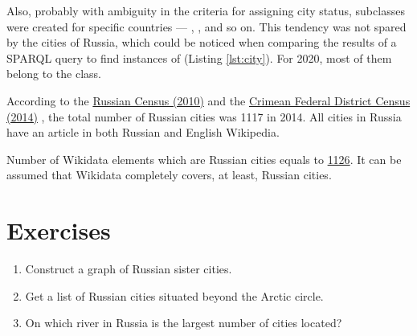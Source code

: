 Also, probably with ambiguity in the criteria for assigning city status, subclasses were created for specific countries — , ,  and so on. This tendency was not spared by the cities of Russia, which could be noticed when comparing the results of a SPARQL query to find instances of   (Listing \ref{lst:city}). For 2020, most of them belong to the  class.

According to the \href{http://www.gks.ru/free\_doc/new\_site/perepis2010/croc/Documents/Vol1/pub-01-03.pdf}{Russian Census (2010)}  and the \href{https://rosstat.gov.ru/free\_doc/new\_site/population/demo/perepis\_krim/KRUM\_2015.pdf}{Crimean Federal District Census (2014)} , the total number of Russian cities was \num{1117} in 2014. All cities in Russia have an article in both Russian and English Wikipedia.

Number of Wikidata elements which are Russian cities equals to \href{https://w.wiki/ngM}{\num{1126}}. It can be assumed that Wikidata completely covers, at least, Russian cities.

\section{Exercises}
\begin{enumerate}
\item Construct a graph of Russian sister cities.
\item Get a list of Russian cities situated beyond the Arctic circle.
\item On which river in Russia is the largest number of cities located?
\end{enumerate}